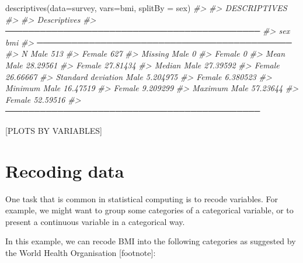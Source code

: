\documentclass[
]{memoir}
\newenvironment{Shaded}{\begin{snugshade}}{\end{snugshade}}
\newcommand{\AttributeTok}[1]{\textcolor[rgb]{0.77,0.63,0.00}{#1}}
\newcommand{\CommentTok}[1]{\textcolor[rgb]{0.56,0.35,0.01}{\textit{#1}}}
\newcommand{\FunctionTok}[1]{\textcolor[rgb]{0.00,0.00,0.00}{#1}}
\newcommand{\NormalTok}[1]{#1}
\begin{document}
\begin{Shaded}
\begin{Highlighting}[]
\FunctionTok{descriptives}\NormalTok{(}\AttributeTok{data=}\NormalTok{survey, }\AttributeTok{vars=}\NormalTok{bmi, }\AttributeTok{splitBy =}\NormalTok{ sex)}
\CommentTok{\#\textgreater{} }
\CommentTok{\#\textgreater{}  DESCRIPTIVES}
\CommentTok{\#\textgreater{} }
\CommentTok{\#\textgreater{}  Descriptives                                 }
\CommentTok{\#\textgreater{}  ──────────────────────────────────────────── }
\CommentTok{\#\textgreater{}                          sex       bmi        }
\CommentTok{\#\textgreater{}  ──────────────────────────────────────────── }
\CommentTok{\#\textgreater{}    N                     Male           513   }
\CommentTok{\#\textgreater{}                          Female         627   }
\CommentTok{\#\textgreater{}    Missing               Male             0   }
\CommentTok{\#\textgreater{}                          Female           0   }
\CommentTok{\#\textgreater{}    Mean                  Male      28.29561   }
\CommentTok{\#\textgreater{}                          Female    27.81434   }
\CommentTok{\#\textgreater{}    Median                Male      27.39592   }
\CommentTok{\#\textgreater{}                          Female    26.66667   }
\CommentTok{\#\textgreater{}    Standard deviation    Male      5.204975   }
\CommentTok{\#\textgreater{}                          Female    6.380523   }
\CommentTok{\#\textgreater{}    Minimum               Male      16.47519   }
\CommentTok{\#\textgreater{}                          Female    9.209299   }
\CommentTok{\#\textgreater{}    Maximum               Male      57.23644   }
\CommentTok{\#\textgreater{}                          Female    52.59516   }
\CommentTok{\#\textgreater{}  ────────────────────────────────────────────}
\end{Highlighting}
\end{Shaded}

{[}PLOTS BY VARIABLES{]}

\hypertarget{recoding-data}{%
\section{Recoding data}\label{recoding-data}}

One task that is common in statistical computing is to recode variables. For example, we might want to group some categories of a categorical variable, or to present a continuous variable in a categorical way.

In this example, we can recode BMI into the following categories as suggested by the World Health Organisation {[}footnote{]}:
\end{document}
